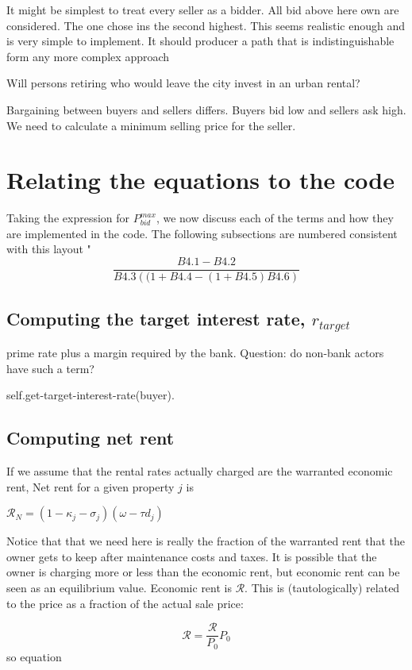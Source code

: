 It might be simplest to treat every seller as a bidder. All bid above here own are considered. The one chose ins the second highest. This  seems realistic enough and is very simple to implement. It should producer a path that is indistinguishable form any more complex approach

Will persons retiring who would leave the city invest in an urban rental?

Bargaining between buyers and sellers differs. Buyers bid low and sellers ask high.  {\color{red}We need to calculate a minimum selling price for the seller}.



\section{Relating the equations to the code}
Taking the expression for $P^{max}_{bid}$, we now discuss each of the terms and how they are implemented in the code. The following subsections are numbered consistent with this layout "
\[\frac{B4.1-B4.2}{B4.3\left( (1+B4.4 - (1+B4.5)B4.6\right)}\]

\subsection{Computing the target interest rate, $r_{target}$}
prime rate plus a margin required by the bank.  Question: do non-bank actors have such a term?

self.get-target-interest-rate(buyer).


\subsection{Computing net rent}
If we assume that the rental rates actually charged are the warranted economic rent, Net rent for a given property $j$ is

$\mathcal{R}_N = (1-\kappa_j - \sigma_j) (\omega - \tau d_j)$

{\color{red}
Notice that that we need here is really the fraction of the warranted rent that the owner gets to keep after maintenance costs and taxes. It is possible that the owner is charging more or less than the economic  rent, but economic rent can be seen as an equilibrium value. Economic rent is $\mathcal{R}$.  This is (tautologically) related to the price as a fraction of the actual sale price:

\[\mathcal{R}= \frac{\mathcal{R}}{P_0}P_0 \]
so equation

}


